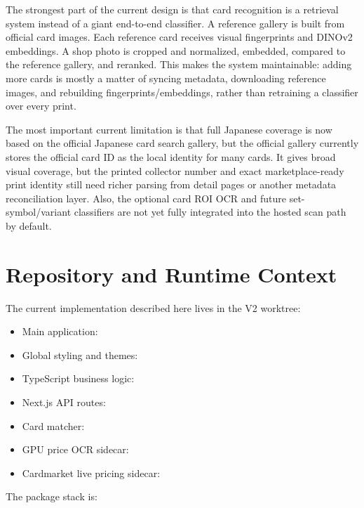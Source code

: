 \documentclass[11pt,a4paper]{article}
\begin{document}
The strongest part of the current design is that card recognition is a retrieval system instead of a giant end-to-end classifier. A reference gallery is built from official card images. Each reference card receives visual fingerprints and DINOv2 embeddings. A shop photo is cropped and normalized, embedded, compared to the reference gallery, and reranked. This makes the system maintainable: adding more cards is mostly a matter of syncing metadata, downloading reference images, and rebuilding fingerprints/embeddings, rather than retraining a classifier over every print.

The most important current limitation is that full Japanese coverage is now based on the official Japanese card search gallery, but the official gallery currently stores the official card ID as the local identity for many cards. It gives broad visual coverage, but the printed collector number and exact marketplace-ready print identity still need richer parsing from detail pages or another metadata reconciliation layer. Also, the optional card ROI OCR and future set-symbol/variant classifiers are not yet fully integrated into the hosted scan path by default.

\section{Repository and Runtime Context}

The current implementation described here lives in the V2 worktree:

\begin{itemize}
  \item Main application: 
  \item Global styling and themes: 
  \item TypeScript business logic: 
  \item Next.js API routes: 
  \item Card matcher: 
  \item GPU price OCR sidecar: 
  \item Cardmarket live pricing sidecar: 
\end{itemize}

The package stack is:
\end{document}
